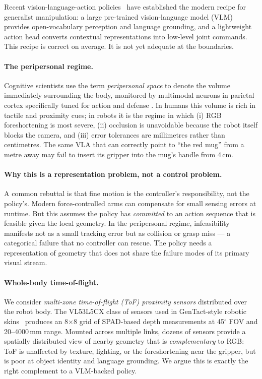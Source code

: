 \documentclass[11pt]{article}
\begin{document}
Recent vision-language-action policies~\citep{brohan2023rt2,kim2024openvla,
black2024pi0,molmo2024} have established the modern recipe for generalist
manipulation: a large pre-trained vision-language model (VLM) provides
open-vocabulary perception and language grounding, and a lightweight action
head converts contextual representations into low-level joint commands.
This recipe is correct on average. It is not yet adequate at the boundaries.

\paragraph{The peripersonal regime.}
Cognitive scientists use the term \emph{peripersonal space} to denote the
volume immediately surrounding the body, monitored by multimodal neurons in
parietal cortex specifically tuned for action and defense
\citep{rizzolatti1981peripersonal,graziano2009peripersonal}. In humans this
volume is rich in tactile and proximity cues; in robots it is the regime in
which (i) RGB foreshortening is most severe, (ii) occlusion is unavoidable
because the robot itself blocks the camera, and (iii) error tolerances are
millimetres rather than centimetres. The same VLA that can correctly point
to ``the red mug'' from a metre away may fail to insert its gripper into
the mug's handle from 4\,cm.

\paragraph{Why this is a representation problem, not a control problem.}
A common rebuttal is that fine motion is the controller's responsibility,
not the policy's. Modern force-controlled arms can compensate for small
sensing errors at runtime. But this assumes the policy has \emph{committed}
to an action sequence that is feasible given the local geometry. In the
peripersonal regime, infeasibility manifests not as a small tracking error
but as collision or grasp miss --- a categorical failure that no controller
can rescue. The policy needs a representation of geometry that does not
share the failure modes of its primary visual stream.

\paragraph{Whole-body time-of-flight.}
We consider \emph{multi-zone time-of-flight (ToF) proximity sensors}
distributed over the robot body. The VL53L5CX class of sensors used in
GenTact-style robotic skins~\citep{patel2023gentact} produces an
8$\times$8 grid of SPAD-based depth measurements at 45$^\circ$ FOV and
20--4000\,mm range. Mounted across multiple links, dozens of sensors
provide a spatially distributed view of nearby geometry that is
\emph{complementary} to RGB: ToF is unaffected by texture, lighting, or
the foreshortening near the gripper, but is poor at object identity and
language grounding. We argue this is exactly the right complement to a
VLM-backed policy.
\end{document}
